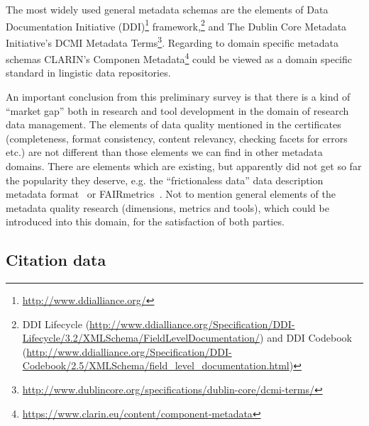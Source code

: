 The most widely used general metadata schemas are the elements of Data Documentation Initiative (DDI)\footnote{\url{http://www.ddialliance.org/}} framework,\footnote{DDI Lifecycle (\url{http://www.ddialliance.org/Specification/DDI-Lifecycle/3.2/XMLSchema/FieldLevelDocumentation/}) and DDI Codebook (\url{http://www.ddialliance.org/Specification/DDI-Codebook/2.5/XMLSchema/field_level_documentation.html})} and The Dublin Core Metadata Initiative's DCMI Metadata Terms\footnote{\url{http://www.dublincore.org/specifications/dublin-core/dcmi-terms/}}. Regarding to domain specific metadata schemas CLARIN's Componen Metadata\footnote{\url{https://www.clarin.eu/content/component-metadata}} could be viewed as a domain specific standard in lingistic data repositories.

An important conclusion from this preliminary survey is that there is a kind of ``market gap'' both in research and tool development in the domain of research data management. The elements of data quality mentioned in the certificates (completeness, format consistency, content relevancy, checking facets for errors etc.) are not different than those elements we can find in other metadata domains. There are elements which are existing, but apparently did not get so far the popularity they deserve, e.g. the ``frictionaless data'' data description metadata format~\cite{fowler2018} or FAIRmetrics~\cite{fairmetrics}. Not to mention general elements of the metadata quality research (dimensions, metrics and tools), which could be introduced into this domain, for the satisfaction of both parties.

\subsection{Citation data}

